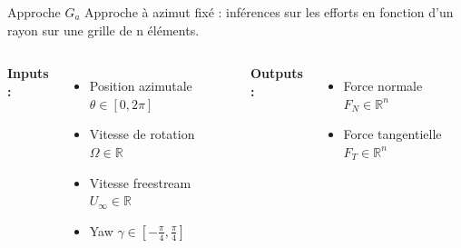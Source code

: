 \documentclass[
11pt,notheorems,hyperref={pdfauthor=whatever}
]{beamer}
\begin{document}
\begin{frame}{Approche $G_a$}
    Approche à azimut fixé : inférences sur les efforts en fonction d’un rayon sur une grille de n éléments.

    \vspace{0.3cm}

    \begin{columns}[c]
        \textbf{Inputs :}
        \begin{itemize}\small
            \item Position azimutale $\theta \in \left[0,2\pi\right]$
            \item Vitesse de rotation $\Omega \in \mathbb{R}$
            \item Vitesse freestream $U_{\infty} \in \mathbb{R}$
            \item Yaw $\gamma \in \left[-\frac{\pi}{4}, \frac{\pi}{4}\right]$
        \end{itemize}

        \centering

        \textbf{Outputs :}
        \begin{itemize}\small
            \item Force normale $F_N \in \mathbb{R}^n$
            \item Force tangentielle $F_T \in \mathbb{R}^n$
        \end{itemize}
    \end{columns}
\end{frame}
\end{document}
